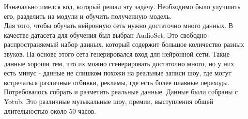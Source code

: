 \documentclass[main.tex]{subfiles}
\begin{document}
Изначально имелся код, который решал эту задачу. Необходимо было улучшить его, разделить на модули и обучить полученную модель.\\
Для того, чтобы обучать нейронную сеть нужно достаточно много данных. В качестве датасета для обучения был выбран AudioSet. Это свободно распространяемый набор данных, который содержит большое количество разных звуков. На основе этого сета генерировался вход для нейронной сети. Такие данные хороши тем, что их можно сгенерировать достаточно много, но у них есть минус - данные не слишком похожи на реальные записи шоу, где могут встречаться различные отбивки, рекламы, где есть более плавные переходы. Потребовалось собрать и разметить реальные данные. Данные были собраны с Yotub. Это различные музыкальные шоу, премии, выступления общей длительностью около 50 часов.
\end{document}
